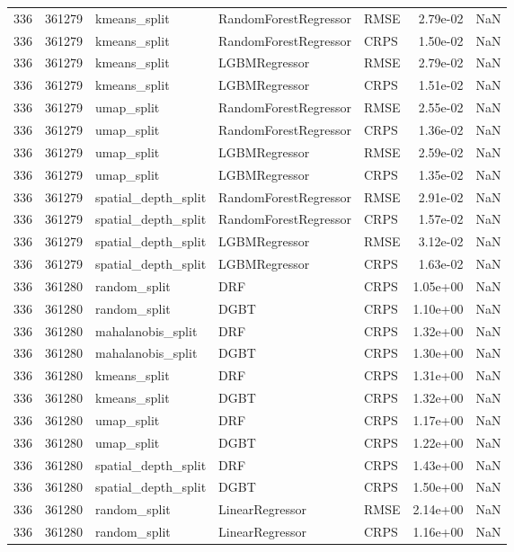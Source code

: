 \begin{tabular}{rrlllrr}
336 & 361279 & kmeans\_split & RandomForestRegressor & RMSE & 2.79e-02 & NaN \\
336 & 361279 & kmeans\_split & RandomForestRegressor & CRPS & 1.50e-02 & NaN \\
336 & 361279 & kmeans\_split & LGBMRegressor & RMSE & 2.79e-02 & NaN \\
336 & 361279 & kmeans\_split & LGBMRegressor & CRPS & 1.51e-02 & NaN \\
336 & 361279 & umap\_split & RandomForestRegressor & RMSE & 2.55e-02 & NaN \\
336 & 361279 & umap\_split & RandomForestRegressor & CRPS & 1.36e-02 & NaN \\
336 & 361279 & umap\_split & LGBMRegressor & RMSE & 2.59e-02 & NaN \\
336 & 361279 & umap\_split & LGBMRegressor & CRPS & 1.35e-02 & NaN \\
336 & 361279 & spatial\_depth\_split & RandomForestRegressor & RMSE & 2.91e-02 & NaN \\
336 & 361279 & spatial\_depth\_split & RandomForestRegressor & CRPS & 1.57e-02 & NaN \\
336 & 361279 & spatial\_depth\_split & LGBMRegressor & RMSE & 3.12e-02 & NaN \\
336 & 361279 & spatial\_depth\_split & LGBMRegressor & CRPS & 1.63e-02 & NaN \\
336 & 361280 & random\_split & DRF & CRPS & 1.05e+00 & NaN \\
336 & 361280 & random\_split & DGBT & CRPS & 1.10e+00 & NaN \\
336 & 361280 & mahalanobis\_split & DRF & CRPS & 1.32e+00 & NaN \\
336 & 361280 & mahalanobis\_split & DGBT & CRPS & 1.30e+00 & NaN \\
336 & 361280 & kmeans\_split & DRF & CRPS & 1.31e+00 & NaN \\
336 & 361280 & kmeans\_split & DGBT & CRPS & 1.32e+00 & NaN \\
336 & 361280 & umap\_split & DRF & CRPS & 1.17e+00 & NaN \\
336 & 361280 & umap\_split & DGBT & CRPS & 1.22e+00 & NaN \\
336 & 361280 & spatial\_depth\_split & DRF & CRPS & 1.43e+00 & NaN \\
336 & 361280 & spatial\_depth\_split & DGBT & CRPS & 1.50e+00 & NaN \\
336 & 361280 & random\_split & LinearRegressor & RMSE & 2.14e+00 & NaN \\
336 & 361280 & random\_split & LinearRegressor & CRPS & 1.16e+00 & NaN \\

\end{tabular}
